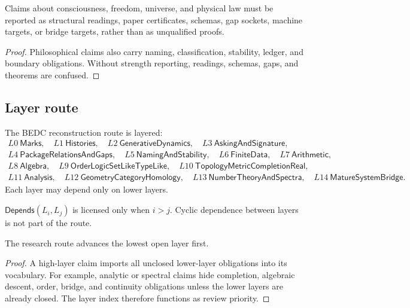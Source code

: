 \begin{corollary}
\label{cor:philosophy-programme-philosophy-reports-strength}
Claims about consciousness, freedom, universe, and physical law must
be reported as structural readings, paper certificates, schemas, gap
sockets, machine targets, or bridge targets, rather than as unqualified
proofs.
\end{corollary}
\begin{proof}
Philosophical claims also carry naming, classification, stability,
ledger, and boundary obligations. Without strength reporting, readings,
schemas, gaps, and theorems are confused.
\end{proof}

\subsection{Layer route}
\label{subsec:philosophy-programme-layer-route}

\begin{definition}
\label{def:philosophy-programme-layer-route}
The BEDC reconstruction route is layered:
$$
\begin{gathered}
L0\ \mathsf{Marks},\quad
L1\ \mathsf{Histories},\quad
L2\ \mathsf{GenerativeDynamics},\quad
L3\ \mathsf{AskingAndSignature},\\
L4\ \mathsf{PackageRelationsAndGaps},\quad
L5\ \mathsf{NamingAndStability},\quad
L6\ \mathsf{FiniteData},\quad
L7\ \mathsf{Arithmetic},\\
L8\ \mathsf{Algebra},\quad
L9\ \mathsf{OrderLogicSetLikeTypeLike},\quad
L10\ \mathsf{TopologyMetricCompletionReal},\\
L11\ \mathsf{Analysis},\quad
L12\ \mathsf{GeometryCategoryHomology},\quad
L13\ \mathsf{NumberTheoryAndSpectra},\quad
L14\ \mathsf{MatureSystemBridge}.
\end{gathered}
$$
Each layer may depend only on lower layers.
\end{definition}

\begin{definition}
\label{def:philosophy-programme-layer-dependency}
\(\mathsf{Depends}(L_i,L_j)\) is licensed only when \(i>j\). Cyclic
dependence between layers is not part of the route.
\end{definition}

\begin{theorem}
\label{thm:philosophy-programme-lowest-open-layer-first}
The research route advances the lowest open layer first.
\end{theorem}
\begin{proof}
A high-layer claim imports all unclosed lower-layer obligations into
its vocabulary. For example, analytic or spectral claims hide
completion, algebraic descent, order, bridge, and continuity
obligations unless the lower layers are already closed. The layer index
therefore functions as review priority.
\end{proof}

